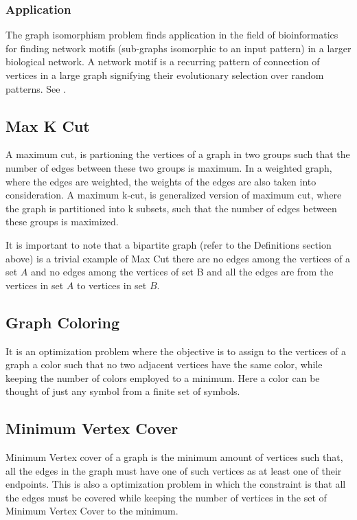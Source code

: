 \subsubsection{Application}
The graph isomorphism problem finds application in the field of bioinformatics
for finding network motifs (sub-graphs isomorphic to an input pattern) in a
larger biological network. A network motif is a recurring pattern of connection
of vertices in a large graph signifying their evolutionary selection over
random patterns. See \cite{Bonnici2013}.

\subsection{Max K Cut}
A maximum cut, is partioning the vertices of a graph in two groups such that
the number of edges between these two groups is maximum. In a weighted graph,
where the edges are weighted, the weights of the edges are also taken into
consideration.  A maximum k-cut, is generalized version of maximum cut, where
the graph is partitioned into k subsets, such that the number of edges between
these groups is maximized.

It is important to note that a bipartite graph (refer to the Definitions
section above) is a trivial example of Max Cut there are no edges among the
vertices of a set $A$ and no edges among the vertices of set B and all the edges
are from the vertices in set $A$ to vertices in set $B$.

\subsection{Graph Coloring}
It is an optimization problem where the objective is to assign to the vertices
of a graph a color such that no two adjacent vertices have the same color,
while keeping the number of colors employed to a minimum. Here a color can be
thought of just any symbol from a finite set of symbols.

\subsection{Minimum Vertex Cover}
Minimum Vertex cover of a graph is the minimum amount of vertices such that,
all the edges in the graph must have one of such vertices as at least one of
their endpoints. This is also a optimization problem in which the constraint is
that all the edges must be covered while keeping the number of vertices in the
set of Minimum Vertex Cover to the minimum.

